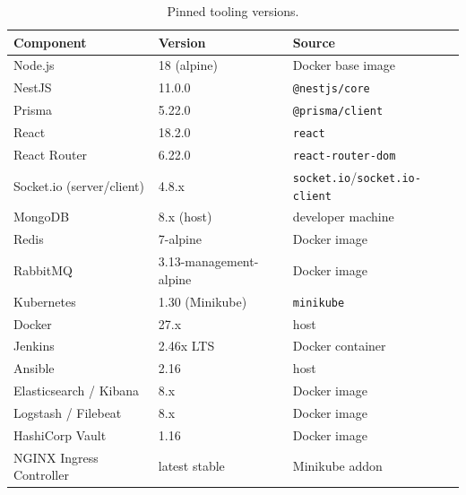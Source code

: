 \documentclass[11pt,a4paper]{article}
\begin{document}
\begin{table}[h]
\centering
\small
\begin{tabular}{l l l}
\toprule
\textbf{Component}        & \textbf{Version}             & \textbf{Source} \\
\midrule
Node.js                   & 18 (alpine)                  & Docker base image \\
NestJS                    & 11.0.0                       & \texttt{@nestjs/core} \\
Prisma                    & 5.22.0                       & \texttt{@prisma/client} \\
React                     & 18.2.0                       & \texttt{react} \\
React Router              & 6.22.0                       & \texttt{react-router-dom} \\
Socket.io (server/client) & 4.8.x                        & \texttt{socket.io}/\texttt{socket.io-client} \\
MongoDB                   & 8.x (host)                   & developer machine \\
Redis                     & 7-alpine                     & Docker image \\
RabbitMQ                  & 3.13-management-alpine       & Docker image \\
Kubernetes                & 1.30 (Minikube)              & \texttt{minikube} \\
Docker                    & 27.x                         & host \\
Jenkins                   & 2.46x LTS                    & Docker container \\
Ansible                   & 2.16                         & host \\
Elasticsearch / Kibana    & 8.x                          & Docker image \\
Logstash / Filebeat       & 8.x                          & Docker image \\
HashiCorp Vault           & 1.16                         & Docker image \\
NGINX Ingress Controller  & latest stable                & Minikube addon \\
\bottomrule
\end{tabular}
\caption{Pinned tooling versions.}
\end{table}
\end{document}
